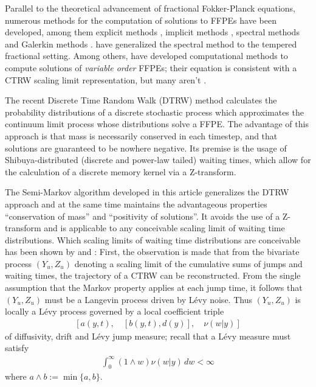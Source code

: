 \documentclass[a4paper,12pt]{elsarticle}
\numberwithin{equation}{section}
\theoremstyle{plain}
\theoremstyle{definition}
\theoremstyle{remark}
\numberwithin{equation}{section}
\newcommand{\1}{\mathbf 1}
\begin{document}
Parallel to the theoretical advancement of fractional Fokker-Planck equations, numerous methods for the computation of solutions to FFPEs have been developed, among them explicit methods \citep{Yuste2005}, implicit methods \citep{Langlands2005a}, spectral methods \citep{Li2009} and Galerkin methods \citep{Mustapha2011}.
\cite{Hanert2014} have generalized the spectral method to the tempered fractional setting.
Among others, \cite{Chen2010} have developed computational methods to compute solutions of \emph{variable order} FFPEs; their equation is consistent with a CTRW scaling limit representation, but many aren't \citep{Straka17}.

The recent Discrete Time Random Walk (DTRW) method \citep{Angstmann2015a,Angstmann2016a} calculates the probability distributions of a discrete stochastic process which approximates the continuum limit process whose distributions solve a FFPE. The advantage of this approach is that mass is necessarily conserved in each timestep, and that solutions are guaranteed to be nowhere negative.  Its premise is the usage of Shibuya-distributed (discrete and power-law tailed) waiting times, which allow for the calculation of a discrete memory kernel via a Z-transform.

The Semi-Markov algorithm developed in this article generalizes the DTRW approach and at the same time maintains the advantageous properties ``conservation of mass'' and ``positivity of solutions''.  It avoids the use of a Z-transform and is applicable to any conceivable scaling limit of waiting time distributions.  Which scaling limits of waiting time distributions are conceivable has been shown by \cite{Straka17} and \cite{BaeumerStraka16}:  First, the observation is made that from the bivariate process $(Y_u, Z_u)$ denoting a scaling limit of the cumulative sums of jumps and waiting times, the trajectory of a CTRW can be reconstructed.
From the single assumption that the Markov property applies at each jump time, it follows that $(Y_u,Z_u)$ must be a Langevin process driven by L\'evy noise.
Thus $(Y_u, Z_u)$ is locally a L\'evy process governed by a local coefficient triple
\begin{align} \label{eq:triple}
[a(y,t), \quad [b(y,t), d(y)], \quad \nu(w|y)]
\end{align}
of diffusivity, drift  and L\'evy jump measure; recall that a L\'evy measure must satisfy
\begin{align}
\label{eq:Levy-measure}
\int_0^\infty (1 \wedge w) \nu(w|y)\,dw < \infty
\end{align}
where $a \wedge b := \min\{a, b\}$.
\end{document}
